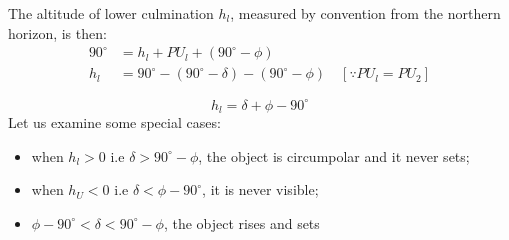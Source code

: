 \documentclass[a4paper,12pt]{extarticle}
\begin{document}
The altitude of lower culmination $h_l$, measured by convention from the northern horizon, is then:
\begin{align*}
	90^\circ&= h_{l}+PU_l+(90^\circ-\phi)\\
	h_l&=90^\circ -(90^\circ-\delta)-(90^\circ-\phi)  \quad [\because PU_l=PU_2]
\end{align*}

\begin{equation}
	\boxed{h_l=\delta+\phi-90^\circ}
\end{equation}
Let us examine some special cases:
\begin{itemize}
	\itemsep0em 
	\item when $h_l>0$ i.e $\delta >90^\circ -\phi$, the object is circumpolar and it never sets;
	\item when $h_U<0$ i.e $\delta <\phi-90^\circ$, it is never visible;
	\item $\phi-90^\circ <\delta<90^\circ-\phi$, the object rises and sets
\end{itemize}
\end{document}

